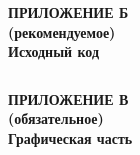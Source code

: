 \newpage




\begin{center}
\textbf{
\MakeUppercase{Приложение Б}\\
(рекомендуемое)\\
Исходный код}
\end{center}

\inputminted{swift}{inc/src/lol.swift}

\newpage

\begin{center}
\textbf{
\MakeUppercase{Приложение В}\\
(обязательное)\\
Графическая часть}
\end{center}
